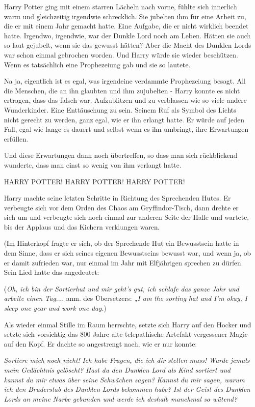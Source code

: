 Harry Potter ging mit einem starren Lächeln nach vorne, fühlte sich innerlich
warm und gleichzeitig irgendwie schrecklich. Sie jubelten ihm für eine Arbeit
zu, die er mit einem Jahr gemacht hatte. Eine Aufgabe, die er nicht wirklich
beendet hatte. Irgendwo, irgendwie, war der Dunkle Lord noch am Leben. Hätten
sie auch so laut gejubelt, wenn sie das gewusst hätten? Aber die Macht des
Dunklen Lords war schon einmal gebrochen worden. Und Harry würde sie wieder
beschützen. Wenn es tatsächlich eine Prophezeiung gab und sie so lautete.

Na ja, eigentlich ist es egal, was irgendeine verdammte Prophezeiung besagt. All
die Menschen, die an ihn glaubten und ihm zujubelten - Harry konnte es nicht
ertragen, dass das falsch war. Aufzublitzen und zu verblassen wie so viele
andere Wunderkinder. Eine Enttäuschung zu sein. Seinem Ruf als Symbol des Lichts
nicht gerecht zu werden, ganz egal, wie er ihn erlangt hatte. Er würde auf jeden
Fall, egal wie lange es dauert und selbst wenn es ihn umbringt, ihre Erwartungen
erfüllen.

Und diese Erwartungen dann noch übertreffen, so dass man sich rückblickend
wunderte, dass man einst so wenig von ihm verlangt hatte.

\glqq{}HARRY POTTER! HARRY POTTER! HARRY POTTER!\grqq{}

Harry machte seine letzten Schritte in Richtung des Sprechenden Hutes. Er
verbeugte sich vor dem Orden des Chaos am Gryffindor-Tisch, dann drehte er sich
um und verbeugte sich noch einmal zur anderen Seite der Halle und wartete, bis
der Applaus und das Kichern verklungen waren.

(Im Hinterkopf fragte er sich, ob der Sprechende Hut ein Bewusstsein hatte in
dem Sinne, dass er sich seines eigenen Bewusstseins bewusst war, und wenn ja, ob
er damit zufrieden war, nur einmal im Jahr mit Elfjährigen sprechen zu dürfen.
Sein Lied hatte das angedeutet:

(\emph{Oh, ich bin der Sortierhut und mir geht's gut, ich schlafe das ganze Jahr
und arbeite einen Tag.}.., anm. des Übersetzers: \emph{„I am the sorting hat and
I'm okay, I sleep one year and work one day.\grqq{}})

Als wieder einmal Stille im Raum herrschte, setzte sich Harry auf den Hocker und
setzte sich vorsichtig das 800 Jahre alte telepathische Artefakt vergessener
Magie auf den Kopf. Er dachte so angestrengt nach, wie er nur konnte:

\emph{Sortiere mich noch nicht! Ich habe Fragen, die ich dir stellen muss!}
\emph{Wurde jemals mein Gedächtnis gelöscht? Hast du den Dunklen Lord als Kind
sortiert und kannst du mir etwas über seine Schwächen sagen?} \emph{Kannst du
mir sagen, warum ich den Bruderstab des Dunklen Lords bekommen habe?} \emph{Ist
der Geist des Dunklen Lords an meine Narbe gebunden und werde ich deshalb
manchmal so wütend?}

